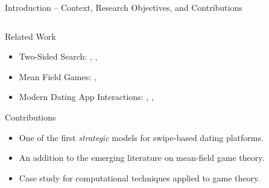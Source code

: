 \documentclass[10pt, aspectratio=169,xcolor=dvipsnames]{beamer}
\makeatletter
\newenvironment{myitemize}{%
   \setlength{\topsep}{0pt}
   \setlength{\partopsep}{0pt}
   \itemize
}{\enditemize}
\makeatother
\begin{document}
\begin{frame}{Introduction – Context, Research Objectives, and Contributions}
\begin{columns}
\begin{column}{0.5\textwidth}
\begin{myitemize}
\setlength\itemsep{1em}
    \item Related Work
    \begin{itemize}
    \setlength\itemsep{0.5em}
        \item Two-Sided Search: \cite{burdett1998two}, \cite{adachi2003search}, \cite{mekonnen2019random}
        \item Mean Field Games: \cite{jovanovic1988anonymous}, \cite{iyer2014mean}
        \item Modern Dating App Interactions: \cite{kanoria2021facilitating}, \cite{olmeda2021towards}, \cite{DBLP:journals/corr/TysonPHS16}
    \end{itemize}
    
    \item Contributions
    \begin{itemize}
        \setlength\itemsep{0.5em}
        \item One of the first \textit{strategic} models for swipe-based dating platforms. 
        \item An addition to the emerging literature on mean-field game theory.
        \item Case study for computational techniques applied to game theory. 
    \end{itemize}
\end{myitemize}
\end{column}
\end{columns}
\end{frame} 
\end{document}
